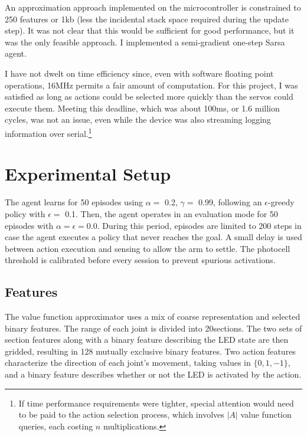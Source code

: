 \documentclass{article}
\begin{document}
	An approximation approach implemented on the microcontroller is constrained to 250 features or 1kb (less the incidental stack space required during the update step). It was not clear that this would be sufficient for good performance, but it was the only feasible approach. I implemented a semi-gradient one-step Sarsa agent.
		
	I have not dwelt on time efficiency since, even with software floating point operations, 16MHz permits a fair amount of computation. For this project, I was satisfied as long as actions could be selected more quickly than the servos could execute them. Meeting this deadline, which was about 100ms, or 1.6 million cycles, was not an issue, even while the device was also streaming logging information over serial.\footnote{If time performance requirements were tighter, special attention would need to be paid to the action selection process, which involves $|A|$ value function queries, each costing $n$ multiplications.}

	
	
	\section{Experimental Setup}
	

	The agent learns for 50 episodes using $\alpha =$ 0.2, $\gamma =$ 0.99,  following an $\epsilon$-greedy policy with $\epsilon=$ 0.1. Then, the agent operates in an evaluation mode for 50 episodes with $\alpha=\epsilon=0.0$. During this period, episodes are limited to 200 steps in case the agent executes a policy that never reaches the goal. A small delay is used between action execution and sensing to allow the arm to settle. The photocell threshold is calibrated before every session to prevent spurious activations.
	
	\subsection{Features}

	The value function approximator uses a mix of coarse representation and selected binary features. The range of each joint is divided into 20\degree\space sections. The two sets of section features along with a binary feature describing the LED state are then gridded, resulting in 128 mutually exclusive binary features. Two action features characterize the direction of each joint's movement, taking values in $\{0, 1, -1\}$, and a binary feature describes whether or not the LED is activated by the action.
	
\end{document}

